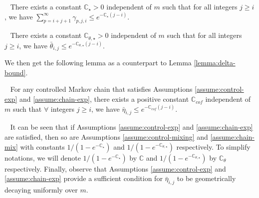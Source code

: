 \documentclass[opre,sglanonrev]{informs4}
\numberwithin{equation}{section}
\newcommand{\lp}{\left(}
\newcommand{\rp}{\right)}
\newcommand{\Cbb}{\mathbb{C}}
\newcommand{\constant}{\Cbb}
\begin{document}
{{{\begin{assumption}~\label{assume:control-exp} There exists a constant $\constant_\star> 0$ independent of $m$ such that for all integers $j\geq i$, we have
$
    \sum_{p=i+j+1}^\infty \gamma_{p,j,i}\leq e^{-\constant_\star\lp j-i\rp}.
$
\end{assumption}
\begin{assumption}~\label{assume:chain-exp} There exists a constant $\constant_{\theta,\star}> 0$ independent of $m$ such that for all integers $j\geq i$, we have
$
\bar \theta_{i,j}\leq e^{-\constant_{\theta,\star}\lp j-i\rp}.
$
\end{assumption}
We then get the following lemma as a counterpart to Lemma \ref{lemma:delta-bound}.
\begin{lemma}~\label{lemma:eta-bound} For any controlled Markov chain that satisfies Assumptions \ref{assume:control-exp} and \ref{assume:chain-exp}, there exists a positive constant $\constant_{cof}$ independent of $m$ such that $\forall$ integers $j\geq i$, we have
$
    \bar \eta_{i,j}\leq e^{-\constant_{cof}(j-i)}.
$
\end{lemma}
\begin{remark}~\label{remark:exp-mix}
It can be seen that if Assumptions \ref{assume:control-exp} and \ref{assume:chain-exp} are satisfied, then so are Assumptions \ref{assume:control-mixing} and \ref{assume:chain-mix} with constants $1/(1-e^{-\constant_\star})$ and $1/(1-e^{-\constant_{\theta, \star}})$ respectively. 
To simplify notations, we will denote $1/(1-e^{-\constant_\star})$ by $\constant$ and $1/(1-e^{-\constant_{\theta, \star}})$ by $\constant_\theta$ respectively. Finally, observe that Assumptions \ref{assume:control-exp} and \ref{assume:chain-exp} provide a sufficient condition for $ \bar \eta_{i,j}$ to be geometrically decaying uniformly over $m$.
\end{remark}
}


}}
\end{document}
